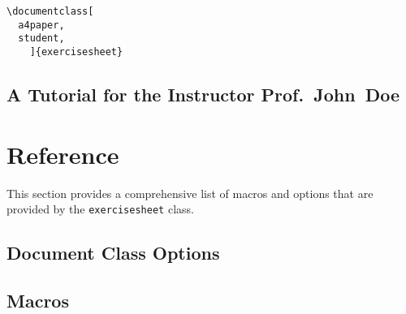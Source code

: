 \documentclass{report}
\def\exercisesheet{\texttt{exercisesheet}}
\begin{document}
\begin{lstlisting}
\documentclass[
  a4paper,
  student,
    ]{exercisesheet}
\end{lstlisting}


\section{A Tutorial for the Instructor Prof.~John~Doe}

\chapter{Reference}

This section provides a comprehensive list of macros and options that
are provided by the \exercisesheet{} class.

\section{Document Class Options}

\section{Macros}
\end{document}
